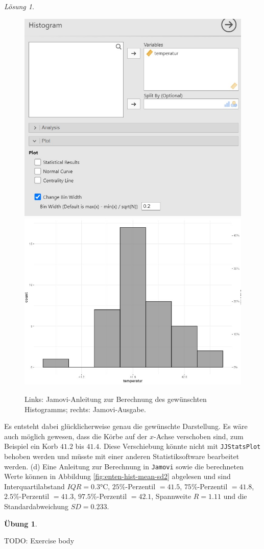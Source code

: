 \documentclass[
]{book}
\theoremstyle{definition}
\theoremstyle{definition}
\theoremstyle{definition}
\newtheorem{exercise}{Übung}[chapter]
\theoremstyle{definition}
\theoremstyle{remark}
\newtheorem*{solution}{Lösung}
\begin{document}
\begin{solution}
\begin{figure}

{\centering \includegraphics[width=0.5\linewidth]{figures/02-exr-enten-hist-binwidth-jmv-input} \includegraphics[width=0.5\linewidth]{figures/02-exr-enten-hist-binwidth-jmv-output} 

}

\caption{Links: Jamovi-Anleitung zur Berechnung des gewünschten Histogramms; rechts: Jamovi-Ausgabe.}\label{fig:enten-hist-binwidth}
\end{figure}

Es entsteht dabei glücklicherweise genau die gewünschte Darstellung. Es wäre auch möglich gewesen, dass die Körbe auf der \(x\)-Achse verschoben sind, zum Beispiel ein Korb \(41.2\) bis \(41.4\). Diese Verschiebung könnte nicht mit \texttt{JJStatsPlot} behoben werden und müsste mit einer anderen Statistiksoftware bearbeitet werden.
(d) Eine Anleitung zur Berechnung in \texttt{Jamovi} sowie die berechneten Werte können in Abbildung \ref{fig:enten-hist-mean-sd2} abgelesen und sind Interquartilabstand \(IQR= 0.3\)°C, \(25\%\)-Perzentil \(=41.5\), \(75\%\)-Perzentil \(=41.8\), \(2.5\%\)-Perzentil \(=41.3\), \(97.5\%\)-Perzentil \(= 42.1\), Spannweite \(R=1.11\) und die Standardabweichung \(SD = 0.233\).

\end{solution}

\begin{exercise}
\protect\hypertarget{exr:temptag-pvai8hwv}{}\label{exr:temptag-pvai8hwv}\leavevmode

TODO: Exercise body

\end{exercise}
\end{document}
